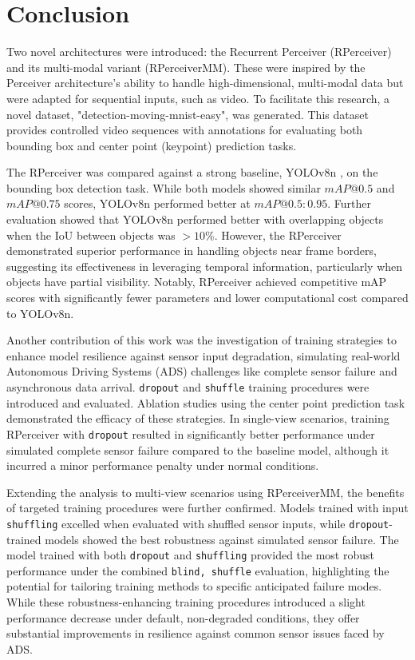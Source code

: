\section{Conclusion} \label{Conclusion}

Two novel architectures were introduced: the Recurrent Perceiver (RPerceiver) and its multi-modal variant (RPerceiverMM). These were inspired by the Perceiver architecture's \cite{jaeglePerceiverGeneralPerception2021} ability to handle high-dimensional, multi-modal data but were adapted for sequential inputs, such as video. To facilitate this research, a novel dataset, "detection-moving-mnist-easy", was generated. This dataset provides controlled video sequences with annotations for evaluating both bounding box and center point (keypoint) prediction tasks.

The RPerceiver was compared against a strong baseline, YOLOv8n \cite{Jocher_Ultralytics_YOLO_2023}, on the bounding box detection task.
While both models showed similar $mAP@0.5$ and $mAP@0.75$ scores, YOLOv8n performed better at $mAP@0.5:0.95$. Further evaluation showed that YOLOv8n performed better with overlapping objects when the $\mathrm{IoU}$ between objects was $\gt 10\%$. However, the RPerceiver demonstrated superior performance in handling objects near frame borders, suggesting its effectiveness in leveraging temporal information, particularly when objects have partial visibility.
Notably, RPerceiver achieved competitive mAP scores with significantly fewer parameters and lower computational cost compared to YOLOv8n.

Another contribution of this work was the investigation of training strategies to enhance model resilience against sensor input degradation, simulating real-world Autonomous Driving Systems (ADS) challenges like complete sensor failure and asynchronous data arrival.
\texttt{dropout} and \texttt{shuffle} training procedures were introduced and evaluated.
Ablation studies using the center point prediction task demonstrated the efficacy of these strategies. In single-view scenarios, training RPerceiver with \texttt{dropout} resulted in significantly better performance under simulated complete sensor failure compared to the baseline model, although it incurred a minor performance penalty under normal conditions.

Extending the analysis to multi-view scenarios using RPerceiverMM, the benefits of targeted training procedures were further confirmed. Models trained with input \texttt{shuffling} excelled when evaluated with shuffled sensor inputs, while \texttt{dropout}-trained models showed the best robustness against simulated sensor failure.
The model trained with both \texttt{dropout} and \texttt{shuffling} provided the most robust performance under the combined \texttt{blind, shuffle} evaluation, highlighting the potential for tailoring training methods to specific anticipated failure modes.
While these robustness-enhancing training procedures introduced a slight performance decrease under default, non-degraded conditions, they offer substantial improvements in resilience against common sensor issues faced by ADS.
